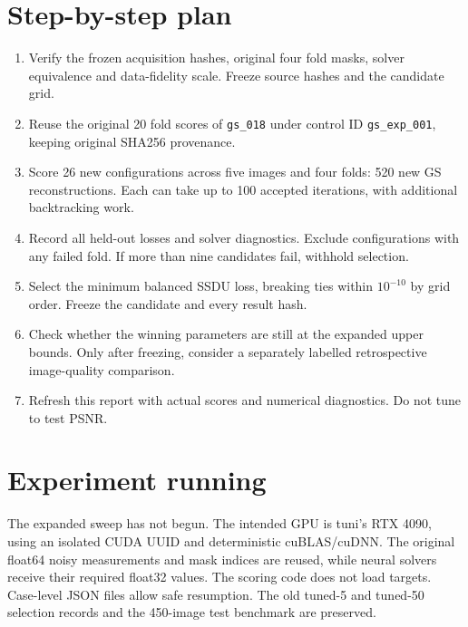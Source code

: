 \documentclass[10pt,a4paper]{article}
\begin{document}
\section{Step-by-step plan}
\begin{enumerate}[leftmargin=1.5em,itemsep=.2em]
\item Verify the frozen acquisition hashes, original four fold
masks, solver equivalence and data-fidelity scale.
Freeze source hashes and the candidate grid.
\item Reuse the original 20 fold scores of
\texttt{gs\_018} under control ID \texttt{gs\_exp\_001},
keeping original SHA256 provenance.
\item Score 26 new configurations across five images
and four folds: 520 new GS reconstructions.
Each can take up to 100 accepted iterations,
with additional backtracking work.
\item Record all held-out losses and solver diagnostics.
Exclude configurations with any failed fold.
If more than nine candidates fail, withhold selection.
\item Select the minimum balanced SSDU loss,
breaking ties within \(10^{-10}\) by grid order.
Freeze the candidate and every result hash.
\item Check whether the winning parameters are still
at the expanded upper bounds.
Only after freezing, consider a separately labelled
retrospective image-quality comparison.
\item Refresh this report with actual scores and
numerical diagnostics. Do not tune to test PSNR.
\end{enumerate}

\section{Experiment running}
The expanded sweep has not begun. The intended GPU is
tuni's RTX 4090, using an isolated CUDA UUID and
deterministic cuBLAS/cuDNN. The original float64
noisy measurements and mask indices are reused,
while neural solvers receive their required float32
values. The scoring code does not load targets.
Case-level JSON files allow safe resumption.
The old tuned-5 and tuned-50 selection records
and the 450-image test benchmark are preserved.
\end{document}
